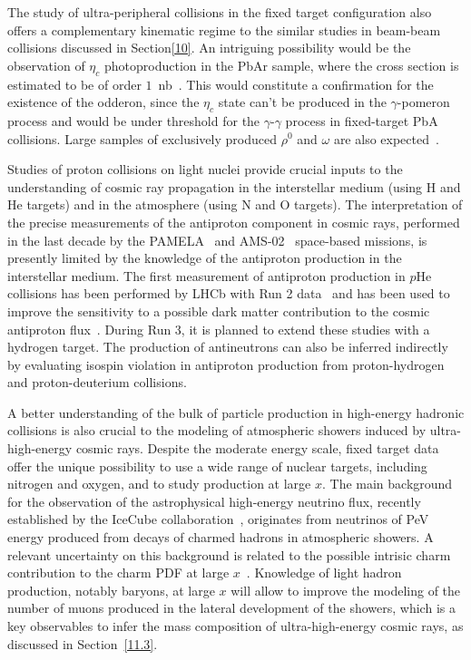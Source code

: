 \documentclass[../report.tex]{subfiles}
\begin{document}
The study of ultra-peripheral collisions in the fixed target
configuration also offers a complementary kinematic regime to
the similar studies in beam-beam collisions discussed in
Section\ref{10}. 
An intriguing possibility would be the observation of $\eta_c$ photoproduction in the PbAr sample, where the cross
section is estimated to be of order $1$~nb~\cite{Goncalves:2015hra}. This would constitute 
a confirmation for the existence of the odderon, since the $\eta_c$ state can't be produced in the $\gamma$-pomeron 
process and would be under threshold for the $\gamma$-$\gamma$ process in fixed-target PbA collisions.
Large samples of exclusively produced $\rho^0$ and $\omega$ are also expected~\cite{Goncalves:2018htp}.


Studies of proton collisions on light nuclei provide crucial inputs to the
understanding of cosmic ray propagation in the interstellar medium
(using H and He targets) and in the atmosphere (using N and O
targets). The interpretation of the precise measurements of the
antiproton component in cosmic rays, performed in the last decade by the
PAMELA~\cite{Pamela} and AMS-02~\cite{AMS02} space-based missions, is
presently limited by the knowledge of the antiproton production
in the interstellar medium. The first measurement of antiproton production
in $p$He collisions has been performed by LHCb with Run 2
data~\cite{LHCb-PAPER-2018-031} and has been used to improve the 
sensitivity to a possible dark matter contribution to the cosmic antiproton
flux~\cite{Reinert:2017aga,Korsmeier:2018gcy}. 
During Run 3, it is planned to extend these studies with a hydrogen
target. The production of antineutrons can also be inferred indirectly
by evaluating isospin violation in antiproton production 
from proton-hydrogen and proton-deuterium collisions.

A better understanding of the bulk of particle production in
high-energy hadronic collisions is also crucial to the modeling of
atmospheric showers induced by ultra-high-energy cosmic rays. 
Despite the moderate energy scale, fixed target data offer the
unique possibility to use a wide range of nuclear targets, including
nitrogen and oxygen, and to study production at large $x$. 
The main background for the observation of the astrophysical
high-energy neutrino flux, recently established by 
the IceCube collaboration~\cite{Aartsen:2013jdh}, originates from
neutrinos of PeV energy produced from decays of charmed hadrons in
atmospheric showers. A relevant uncertainty on this background
is related to the possible intrisic charm contribution to the charm
PDF at large $x$~\cite{Laha:2016dri}.  
Knowledge of light hadron production, notably baryons, at large $x$ will allow 
to improve the modeling of the number of muons produced in the lateral
development of the showers, which is a key observables to infer the
mass composition of ultra-high-energy cosmic rays, as discussed in Section~\ref{11.3}.
\end{document}
